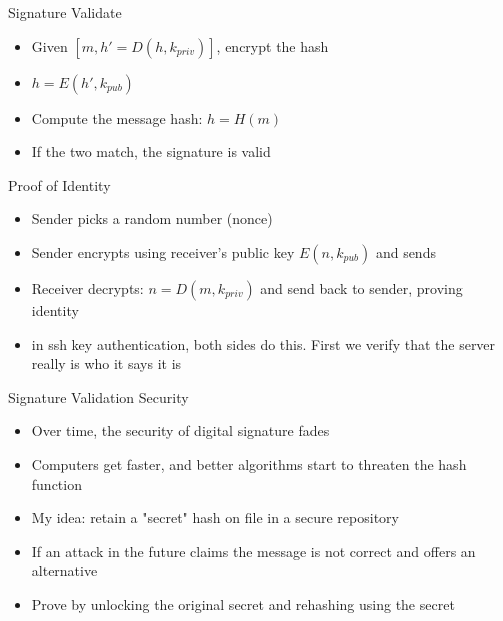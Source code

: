 \begin{withoutheadline}
\begin{frame}{Signature Validate}
    \begin{itemize}
        \item Given $[m, h' = D(h, k_{priv})]$, encrypt the hash
        \item $h = E(h', k_{pub})$
        \item Compute the message hash: $h = H(m)$
        \item If the two match, the signature is valid
    \end{itemize}
\end{frame}

\begin{frame}{Proof of Identity}
    \begin{itemize}
        \item Sender picks a random number (nonce)
        \item Sender encrypts using receiver's public key $E(n, k_{pub})$ and sends
        \item Receiver decrypts: $n = D(m, k_{priv})$ and send back to sender, proving identity
        \item in ssh key authentication, both sides do this. First we verify that the server really is who it says it is
    \end{itemize}
\end{frame}

\begin{frame}{Signature Validation Security}
    \begin{itemize}
        \item Over time, the security of digital signature fades
        \item Computers get faster, and better algorithms start to threaten the hash function
        \item My idea: retain a "secret" hash on file in a secure repository
        \item If an attack in the future claims the message is not correct and offers an alternative
        \item Prove by unlocking the original secret and rehashing using the secret
    \end{itemize}
\end{frame}


\end{withoutheadline}
